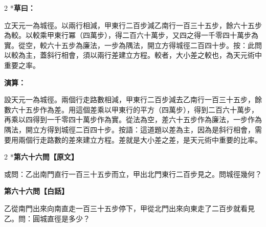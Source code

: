 \documentclass[11pt,a4paper]{article}
\begin{document}
\begin{paracol}{2}
\switchcolumn[0]*\textbf{草曰：}

\small 立天元一為城徑。以兩行相減，甲東行二百步減乙南行一百三十五步，餘六十五步為較。以較乘甲東行冪（四萬步），得二百六十萬步，又四之得一千零四十萬步為實。從空，較六十五步為廉法，一步為隅法，開立方得城徑二百四十步。按：此問以較為主，蓋斜行相會，須以兩行差建立方程。較者，大小差之較也，為天元術中重要之率。

\switchcolumn\textbf{演算：}

\small 設天元一為城徑。兩個行走路數相減，甲東行二百步減去乙南行一百三十五步，餘數六十五步作為差。用這個差乘以甲東行的平方（四萬步），得到二百六十萬步，再乘以四得到一千零四十萬步作為實。從法為空，差六十五步作為廉法，一步作為隅法，開立方得到城徑二百四十步。按語：這道題以差為主，因為是斜行相會，需要用兩個行走路數的差來建立方程。差就是大小差之差，是天元術中重要的比率。
\end{paracol}

\vspace{0.1cm}
\noindent{}
\par\vspace{0.3cm}

\begin{paracol}{2}
\switchcolumn[0]*\noindent\textbf{第六十六問【原文】}

\small 或問：乙出南門直行一百三十五步而立，甲出北門東行二百步見之。問城徑幾何？

\switchcolumn\noindent\textbf{第六十六問【白話】}

\small 乙從南門出來向南直走一百三十五步停下，甲從北門出來向東走了二百步就看見乙。問：圓城直徑是多少？
\end{paracol}

\vspace{0.1cm}
\noindent{}
\par\vspace{0.15cm}
\end{document}
